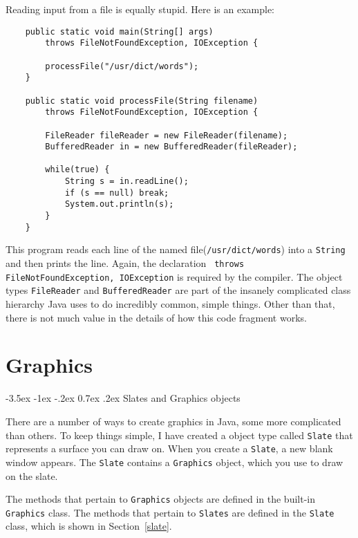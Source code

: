\documentclass{book}
\makeatletter
\newcounter{exercisenum}
\renewcommand{\section}{\@startsection 
    {section} {1} {0mm}%
    {-3.5ex \@plus -1ex \@minus -.2ex}%
    {0.7ex \@plus.2ex}%
    {\normalfont\Large\bfseries}}
\newcommand{\clearemptydoublepage}{\newpage{\pagestyle{empty}\cleardoublepage}}
\newcommand{\beforechapter}{
    \cleardoublepage 
    \setcounter{exercisenum}{0}
}
\makeatother
\begin{document}
Reading input from a file is equally stupid.  Here is an
example:

\begin{verbatim}
    public static void main(String[] args)
        throws FileNotFoundException, IOException {
	
        processFile("/usr/dict/words");
    }

    public static void processFile(String filename)
        throws FileNotFoundException, IOException {

        FileReader fileReader = new FileReader(filename);
        BufferedReader in = new BufferedReader(fileReader);

        while(true) {
            String s = in.readLine();
            if (s == null) break;
            System.out.println(s);
        }
    }
\end{verbatim}

This program reads each line of the named file({\tt /usr/dict/words})
into a {\tt String} and then prints the line.  Again, the declaration {\tt
throws FileNotFoundException, IOException} is required by the
compiler.  The object types {\tt FileReader} and {\tt BufferedReader}
are part of the insanely complicated class hierarchy Java uses to do
incredibly common, simple things.  Other than that, there is not
much value in the details of how this code fragment works.


\beforechapter
\chapter{Graphics}

\section{Slates and Graphics objects}
\label{graphics}

There are a number of ways to create graphics in Java, some more
complicated than others.  To keep things simple, I have created
a object type called {\tt Slate} that represents a surface you can
draw on.  When you create a {\tt Slate}, a new blank window appears.
The {\tt Slate} contains a {\tt Graphics} object, which you use
to draw on the slate.

The methods that pertain to {\tt Graphics} objects are defined
in the built-in {\tt Graphics} class.  The methods that pertain
to {\tt Slates} are defined in the {\tt Slate} class, which is
shown in Section~\ref{slate}.
\end{document}
